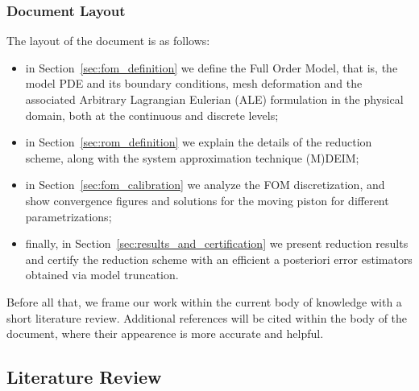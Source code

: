 \documentclass[thesis.tex]{subfiles}
\begin{document}
\subsubsection{Document Layout}
The layout of the document is as follows:
\begin{itemize}
    \item in Section~\ref{sec:fom_definition} we define the Full Order Model, that is, 
    the model PDE and its boundary conditions, 
    mesh deformation and the associated Arbitrary Lagrangian Eulerian (ALE) formulation
    in the physical domain,
    both at the continuous and discrete levels;
    \item in Section~\ref{sec:rom_definition} we explain the details of the reduction scheme, 
    along with the system approximation technique (M)DEIM;
    \item in Section~\ref{sec:fom_calibration} we analyze the FOM discretization, 
    and show convergence figures and solutions for the moving piston for different parametrizations;
    \item finally, in Section~\ref{sec:results_and_certification} we present reduction results
    and certify the reduction scheme with an efficient a posteriori error estimators obtained via model truncation.
\end{itemize}
Before all that, we frame our work within the current body of knowledge 
with a short literature review.
Additional references will be cited within the body of the document, 
where their appearence is more accurate and helpful.  

\subsection{Literature Review}

\end{document}
